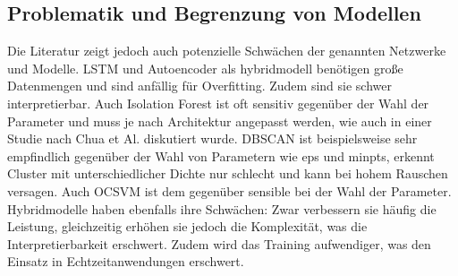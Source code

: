 \documentclass[a4paper,12pt]{article}
\begin{document}
	\subsection{Problematik und Begrenzung von Modellen}
	Die Literatur zeigt jedoch auch potenzielle Schwächen der genannten Netzwerke und Modelle. LSTM und Autoencoder als \gls{hybridmodell} benötigen große Datenmengen und sind anfällig für Overfitting. Zudem sind sie schwer interpretierbar. Auch Isolation Forest ist oft sensitiv gegenüber der Wahl der Parameter und muss je nach Architektur angepasst werden, wie auch in einer Studie nach Chua et Al. diskutiert wurde\cite{chua2024web}. DBSCAN ist beispielsweise sehr empfindlich gegenüber der Wahl von Parametern wie \gls{eps} und \gls{minpts}, erkennt Cluster mit unterschiedlicher Dichte nur schlecht und kann bei hohem Rauschen versagen. Auch OCSVM ist dem gegenüber sensible bei der Wahl der Parameter.
	\\[0.5em]
	Hybridmodelle haben ebenfalls ihre Schwächen: Zwar verbessern sie häufig die Leistung, gleichzeitig erhöhen sie jedoch die Komplexität, was die Interpretierbarkeit erschwert. Zudem wird das Training aufwendiger, was den Einsatz in Echtzeitanwendungen erschwert.
	
\end{document}
